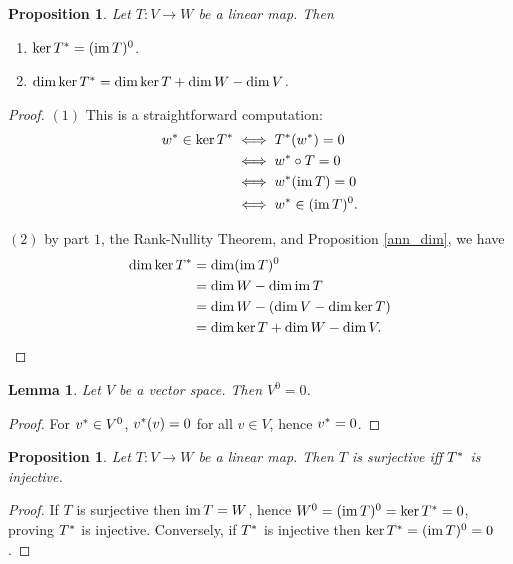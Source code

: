 \documentclass[12pt]{article}
\theoremstyle{definition}
\theoremstyle{plain}
\newtheorem{proposition}[theorem] {Proposition}
\newtheorem{lemma}[theorem]{Lemma}
\numberwithin{equation}{section}
\theoremstyle{definition}
\begin{document}
\begin{proposition}
Let $ T : V \to W $ be a linear map. Then
\begin{enumerate}
\item $ \ker T^{*} = (\operatorname{im} T)^0 $.
\item $ \dim \ker T^{*} = \dim \ker T + \dim W - \dim V $.
\end{enumerate}
\end{proposition}

\begin{proof}
$ (1) $ This is a straightforward computation:
\begin{align*}
	w^{*} \in \ker T^{*} &\iff T^{*}(w^{*}) = 0\\
	&\iff w^{*} \circ T = 0\\
	&\iff w^{*} (\operatorname{im} T) = 0\\
	&\iff w^{*} \in (\operatorname{im} T) ^0.
\end{align*}

$ (2) $ by part $ 1 $, the Rank-Nullity Theorem, and Proposition \ref{ann_dim}, we have 
\begin{align*}
	\dim \ker T^{*} &= \dim (\operatorname{im} T)^0\\
	&= \dim W - \dim \operatorname{im} T\\
	&= \dim W - (\dim V - \dim \ker T)\\
	&= \dim \ker T + \dim W - \dim V.
\end{align*}
\end{proof}

\begin{lemma}
Let $ V $ be a vector space. Then $ V^0 = 0 $.
\end{lemma}

\begin{proof}
For $ v^{*} \in V^0 $, $ v^{*}(v) = 0 $ for all $ v \in V $, hence $ v^{*} = 0 $.
\end{proof}

\begin{proposition}
Let $ T : V \to W $ be a linear map. Then $ T $ is surjective iff $ T^{*} $ is injective.
\end{proposition}

\begin{proof}
If $ T $ is surjective then $ \operatorname{im} T = W $, hence $ W^0 = (\operatorname{im} T)^0 = \ker T^{*} = 0 $, proving $ T^{*} $ is injective. Conversely, if $ T^{*} $ is injective then $ \ker T^{*} = (\operatorname{im} T)^0 = 0 $.
\end{proof}
\end{document}
